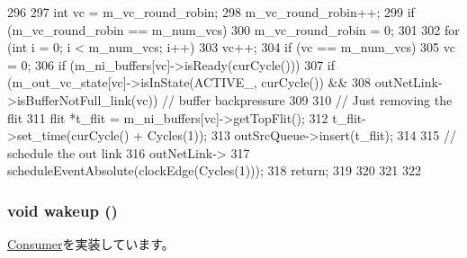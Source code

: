 \begin{DoxyCode}
296 {
297     int vc = m_vc_round_robin;
298     m_vc_round_robin++;
299     if (m_vc_round_robin == m_num_vcs)
300         m_vc_round_robin = 0;
301 
302     for (int i = 0; i < m_num_vcs; i++) {
303         vc++;
304         if (vc == m_num_vcs)
305             vc = 0;
306         if (m_ni_buffers[vc]->isReady(curCycle())) {
307             if (m_out_vc_state[vc]->isInState(ACTIVE_, curCycle()) &&
308                outNetLink->isBufferNotFull_link(vc)) {  // buffer backpressure
309 
310                 // Just removing the flit
311                 flit *t_flit = m_ni_buffers[vc]->getTopFlit();
312                 t_flit->set_time(curCycle() + Cycles(1));
313                 outSrcQueue->insert(t_flit);
314 
315                 // schedule the out link
316                 outNetLink->
317                     scheduleEventAbsolute(clockEdge(Cycles(1)));
318                 return;
319             }
320         }
321     }
322 }
\end{DoxyCode}
\hypertarget{classNetworkInterface_ae674290a26ecbd622c5160e38e8a4fe9}{
\subsubsection[{wakeup}]{\setlength{\rightskip}{0pt plus 5cm}void wakeup ()}}
\label{classNetworkInterface_ae674290a26ecbd622c5160e38e8a4fe9}


\hyperlink{classConsumer_a623e3e7d1b1c725d70009f7b01a421b9}{Consumer}を実装しています。


